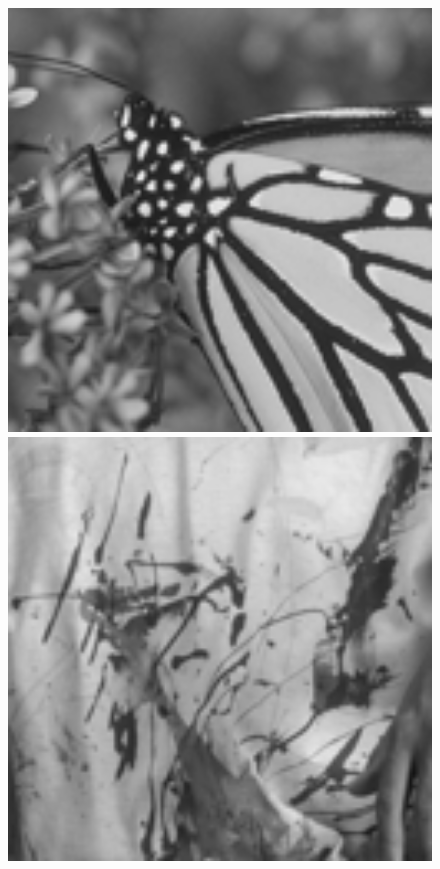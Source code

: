 \documentclass[runningheads]{llncs}
\begin{document}
\begin{figure}[t]
{\begin{minipage}{0.09\textwidth}
\end{minipage}
\begin{minipage}{0.09\textwidth}
\includegraphics[width=1.06\textwidth]{monarch.png}
\end{minipage}
\begin{minipage}{0.09\textwidth}
\includegraphics[width=1.06\textwidth]{paint.png}

\end{minipage}}
\end{figure}
\end{document}
